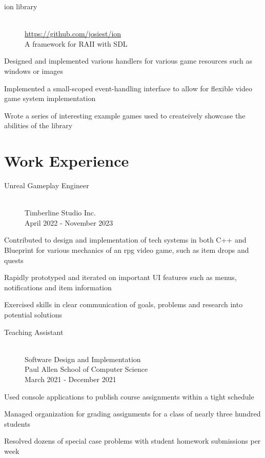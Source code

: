 \documentclass[10pt]{article}
\newenvironment{itemize*}
{\begin{itemize}[leftmargin=*]
    \setlength{\parskip}{0.5pt}}
{\end{itemize}}
\begin{document}
\begin{paracol}{2}
\begin{description}
\item[ion library] \hfill \\
    \url{https://github.com/josiest/ion}\\
    A framework for RAII with SDL
\end{description}
\begin{itemize*}
\item Designed and implemented various handlers for various game resources such
      as windows or images
\item Implemented a small-scoped event-handling interface to allow for flexible
      video game system implementation
\item Wrote a series of interesting example games used to createively showcase
      the abilities of the library
\end{itemize*}

\switchcolumn
\section*{Work Experience}

\begin{description}
\item[Unreal Gameplay Engineer] \hfill \\
    Timberline Studio Inc. \\
    April 2022 - November 2023
\end{description}
\begin{itemize*}
\item Contributed to design and implementation of tech systems in both C++ and Blueprint for various mechanics of an rpg video game, such as item drops and quests
\item Rapidly prototyped and iterated on important UI features such as menus, notifications and item information
\item Exercised skills in clear communication of goals, problems and research into potential solutions
\end{itemize*}


\begin{description}
\item[Teaching Assistant] \hfill \\
    Software Design and Implementation \\
    Paul Allen School of Computer Science \\
    March 2021 - December 2021
\end{description}
\begin{itemize*}
\item Used console applications to publish course assignments within a tight schedule
\item Managed organization for grading assignments for a class of nearly three
      hundred students
\item Resolved dozens of special case problems with student homework
      submissions per week
\end{itemize*}


\end{paracol}
\end{document}
